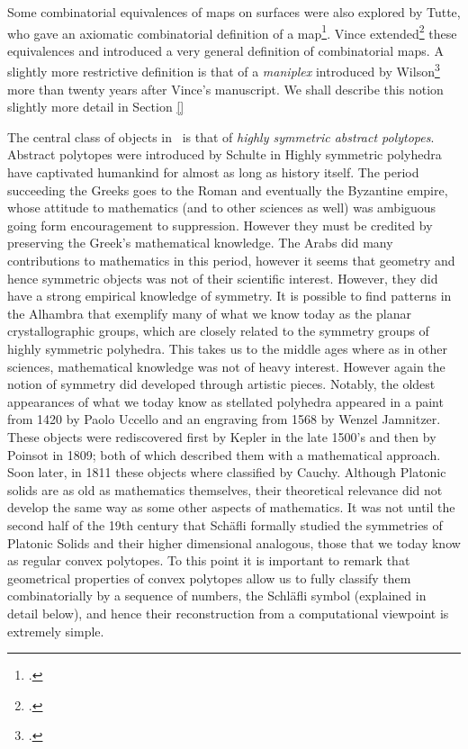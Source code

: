 Some combinatorial equivalences of maps on surfaces were also explored by Tutte, who gave an axiomatic combinatorial definition of a map\footcite{Tutte_1973_WhatIsMap}. Vince extended\footcite{Vince_1983_CombinatorialMaps} these equivalences and introduced a very general definition of combinatorial maps.
A slightly more restrictive definition is that of a \emph{maniplex} introduced by Wilson\footcite{Wilson_2012_ManiplexesPart1} more than twenty years after Vince's manuscript. We shall describe this notion slightly more detail in Section \ref{} \missingref

The central class of objects in \ourp\ is that of \emph{highly symmetric abstract polytopes}. Abstract polytopes were introduced by Schulte in
Highly symmetric polyhedra have captivated humankind for almost as long as history itself.
The period succeeding the Greeks goes to the Roman and eventually the Byzantine empire, whose attitude to mathematics (and to other sciences as well) was ambiguous going form encouragement to suppression. However they must be credited by preserving the Greek’s mathematical knowledge. The Arabs did many contributions to mathematics in this period, however it seems that geometry and hence symmetric objects was not of their scientific interest. However, they did have a strong empirical knowledge of symmetry. It is possible to find patterns in the Alhambra that exemplify many of what we know today as the planar crystallographic groups, which are closely related to the symmetry groups of highly symmetric polyhedra.
This takes us to the middle ages where as in other sciences, mathematical knowledge was not of heavy interest. However again the notion of symmetry did developed through artistic pieces. Notably, the oldest appearances of what we today know as stellated polyhedra appeared in a paint from 1420 by Paolo Uccello and an engraving from 1568 by Wenzel Jamnitzer. These objects were rediscovered first by Kepler in the late 1500’s and then by Poinsot in 1809; both of which described them with a mathematical approach. Soon later, in 1811 these objects where classified by Cauchy.
Although Platonic solids are as old as mathematics themselves, their theoretical relevance did not develop the same way as some other aspects of mathematics. It was not until the second half of the 19th century that Schäfli formally studied the symmetries of Platonic Solids and their higher dimensional analogous, those that we today know as regular convex polytopes. To this point it is important to remark that geometrical properties of convex polytopes allow us to fully classify them combinatorially by a sequence of numbers, the Schläfli symbol (explained in detail below), and hence their reconstruction from a computational viewpoint is extremely simple.
